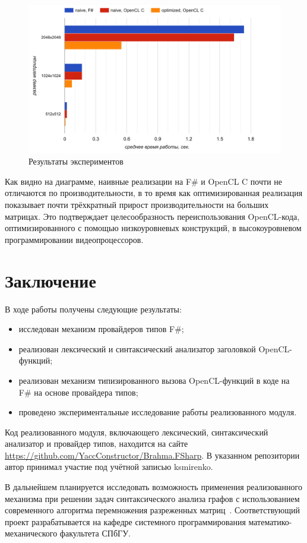 \documentclass[14pt]{matmex-diploma}
\begin{document}
\begin{figure}[h]
\centering
\includegraphics[width=15cm]{courseworkpictures/chart.png}
\caption{Результаты экспериментов}
\label{experiments}
\end{figure}

Как видно на диаграмме, наивные реализации на F\# и OpenCL C почти не отличаются по производительности, в то время как оптимизированная реализация показывает почти трёхкратный прирост производительности на больших матрицах. Это подтверждает целесообразность переиспользования OpenCL-кода, оптимизированного с помощью низкоуровневых конструкций, в высокоуровневом программировании видеопроцессоров.

\section*{Заключение}
В ходе работы получены следующие результаты:
\begin{itemize}
    \item исследован механизм провайдеров типов F\#;
    \item реализован лексический и синтаксический анализатор заголовкой OpenCL-функций;
    \item реализован механизм типизированного вызова OpenCL-функций в коде на F\# на основе провайдера типов;
    \item проведено экспериментальные исследование работы реализованного модуля.
\end{itemize}

Код реализованного модуля, включающего лексический, синтаксический анализатор и провайдер типов, находится на сайте \url{https://github.com/YaccConstructor/Brahma.FSharp}. В указанном репозитории автор принимал участие под учётной записью ksmirenko.

В дальнейшем планируется исследовать возможность применения реализованного механизма при решении задач синтаксического анализа графов с использованием современного алгоритма перемножения разреженных матриц~\cite{SparseMatrixMultiply}. Соответствующий проект разрабатывается на кафедре системного программирования математико-механического факультета СПбГУ.

\setmonofont[Mapping=tex-text]{CMU Typewriter Text}


\end{document}
